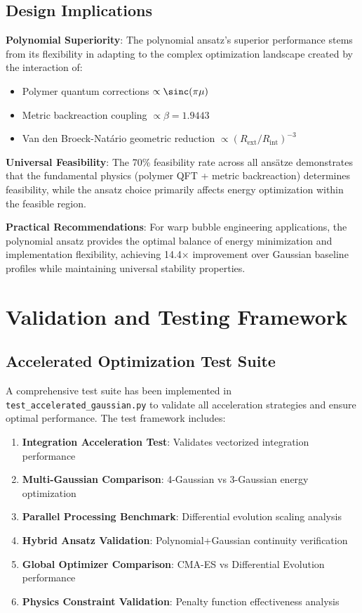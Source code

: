 \documentclass[12pt,a4paper]{article}
\begin{document}
\subsection{Design Implications}

\textbf{Polynomial Superiority}: The polynomial ansatz's superior performance stems from its flexibility in adapting to the complex optimization landscape created by the interaction of:
\begin{itemize}
\item Polymer quantum corrections $\propto \sinc(\pi\mu)$
\item Metric backreaction coupling $\propto \beta = 1.9443$
\item Van den Broeck-Natário geometric reduction $\propto (R_{\text{ext}}/R_{\text{int}})^{-3}$
\end{itemize}

\textbf{Universal Feasibility}: The 70\% feasibility rate across all ansätze demonstrates that the fundamental physics (polymer QFT + metric backreaction) determines feasibility, while the ansatz choice primarily affects energy optimization within the feasible region.

\textbf{Practical Recommendations}: For warp bubble engineering applications, the polynomial ansatz provides the optimal balance of energy minimization and implementation flexibility, achieving 14.4× improvement over Gaussian baseline profiles while maintaining universal stability properties.

\section{Validation and Testing Framework}
\label{sec:validation_framework}

\subsection{Accelerated Optimization Test Suite}

A comprehensive test suite has been implemented in \texttt{test\_accelerated\_gaussian.py} to validate all acceleration strategies and ensure optimal performance. The test framework includes:

\begin{enumerate}
\item \textbf{Integration Acceleration Test}: Validates vectorized integration performance
\item \textbf{Multi-Gaussian Comparison}: 4-Gaussian vs 3-Gaussian energy optimization
\item \textbf{Parallel Processing Benchmark}: Differential evolution scaling analysis
\item \textbf{Hybrid Ansatz Validation}: Polynomial+Gaussian continuity verification
\item \textbf{Global Optimizer Comparison}: CMA-ES vs Differential Evolution performance
\item \textbf{Physics Constraint Validation}: Penalty function effectiveness analysis
\end{enumerate}
\end{document}
